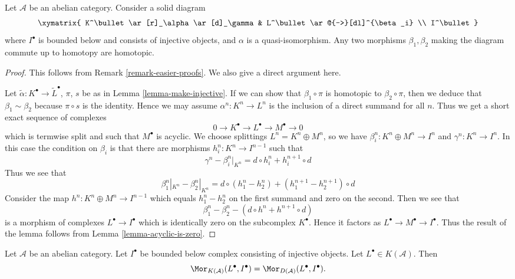 \begin{lemma}
\label{lemma-morphisms-equal-up-to-homotopy}
Let $\mathcal{A}$ be an abelian category.
Consider a solid diagram
$$
\xymatrix{
K^\bullet \ar[r]_\alpha \ar[d]_\gamma & L^\bullet \ar@{-->}[dl]^{\beta_i} \\
I^\bullet
}
$$
where $I^\bullet$ is bounded below and consists of injective
objects, and $\alpha$ is a quasi-isomorphism.
Any two morphisms $\beta_1, \beta_2$ making the diagram commute
up to homotopy are homotopic.
\end{lemma}

\begin{proof}
This follows from
Remark \ref{remark-easier-proofs}.
We also give a direct argument here.

\medskip\noindent
Let $\tilde \alpha : K^\bullet \to \tilde L^\bullet$, $\pi$, $s$ be as in
Lemma \ref{lemma-make-injective}. If we can show that $\beta_1 \circ\pi$
is homotopic to $\beta_2 \circ \pi$, then we deduce that
$\beta_1 \sim \beta_2$ because $\pi \circ s$ is the identity.
Hence we may assume $\alpha^n : K^n \to L^n$ is the
inclusion of a direct summand for all $n$. Thus we get a
short exact sequence of complexes
$$
0 \to K^\bullet \to L^\bullet \to M^\bullet \to 0
$$
which is termwise split and such that $M^\bullet$ is acyclic.
We choose splittings $L^n = K^n \oplus M^n$, so we have
$\beta_i^n : K^n \oplus M^n \to I^n$ and $\gamma^n : K^n \to I^n$.
In this case the condition on $\beta_i$ is that there are morphisms
$h_i^n : K^n \to I^{n - 1}$ such that
$$
\gamma^n - \beta_i^n|_{K^n} = d \circ h_i^n + h_i^{n + 1} \circ d
$$
Thus we see that
$$
\beta_1^n|_{K^n} - \beta_2^n|_{K^n}
=
d \circ (h_1^n - h_2^n) + (h_1^{n + 1} - h_2^{n + 1}) \circ d
$$
Consider the map $h^n : K^n \oplus M^n \to I^{n - 1}$ which
equals $h_1^n - h_2^n$ on the first summand and zero on the second.
Then we see that
$$
\beta_1^n - \beta_2^n
-
(d \circ h^n + h^{n + 1} \circ d)
$$
is a morphism of complexes $L^\bullet \to I^\bullet$
which is identically zero on the subcomplex $K^\bullet$.
Hence it factors as $L^\bullet \to M^\bullet \to I^\bullet$.
Thus the result of the lemma follows from Lemma \ref{lemma-acyclic-is-zero}.
\end{proof}

\begin{lemma}
\label{lemma-morphisms-into-injective-complex}
Let $\mathcal{A}$ be an abelian category.
Let $I^\bullet$ be bounded below complex consisting of injective
objects. Let $L^\bullet \in K(\mathcal{A})$. Then
$$
\Mor_{K(\mathcal{A})}(L^\bullet, I^\bullet)
=
\Mor_{D(\mathcal{A})}(L^\bullet, I^\bullet).
$$
\end{lemma}

